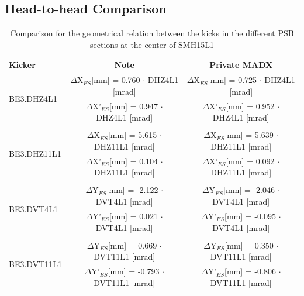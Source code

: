 \documentclass[11pt,letter,english]{article}
\begin{document}
\subsection*{Head-to-head Comparison}

\begin{table}[h]
  \centering
  \caption{
    Comparison for the geometrical relation between the kicks in the different PSB sections at the center of SMH15L1
    }

  \label{tab:geom_rel}
\begin{tabular}{ |l|c|c| }        \hline
  Kicker & Note & Private MADX \\ \hline
  
  \multirow{2}{*}{BE3.DHZ4L1} & $\Delta$X$_{ES}$[mm]  = 0.760 $\cdot$ DHZ4L1 [mrad] & $\Delta$X$_{ES}$[mm]  = {\color{red} 0.725} $\cdot$ DHZ4L1 [mrad] \\ \cline{2-3}
                              & $\Delta$X'$_{ES}$[mm] = 0.947 $\cdot$ DHZ4L1 [mrad] & $\Delta$X'$_{ES}$[mm] = {\color{red} 0.952} $\cdot$ DHZ4L1 [mrad] \\ \hline 
  \multicolumn{3}{|c|}{} \\ \hline

  \multirow{2}{*}{BE3.DHZ11L1} & $\Delta$X$_{ES}$[mm]  = 5.615 $\cdot$ DHZ11L1 [mrad] & $\Delta$X$_{ES}$[mm]  = {\color{red} 5.639} $\cdot$ DHZ11L1 [mrad] \\ \cline{2-3}
                               & $\Delta$X'$_{ES}$[mm] = 0.104 $\cdot$ DHZ11L1 [mrad] & $\Delta$X'$_{ES}$[mm] = {\color{red} 0.092} $\cdot$ DHZ11L1 [mrad] \\ \hline 
  \multicolumn{3}{|c|}{} \\ \hline

  \multirow{2}{*}{BE3.DVT4L1} & $\Delta$Y$_{ES}$[mm]  = -2.122 $\cdot$ DVT4L1 [mrad] & $\Delta$Y$_{ES}$[mm]  = {\color{red} -2.046} $\cdot$ DVT4L1 [mrad] \\ \cline{2-3}
                              & $\Delta$Y'$_{ES}$[mm] =  0.021 $\cdot$ DVT4L1 [mrad] & $\Delta$Y'$_{ES}$[mm] = {\color{red} -0.095} $\cdot$ DVT4L1 [mrad] \\ \hline 
  \multicolumn{3}{|c|}{} \\ \hline
 
  \multirow{2}{*}{BE3.DVT11L1} & $\Delta$Y$_{ES}$[mm]  =  0.669 $\cdot$ DVT11L1 [mrad] & $\Delta$Y$_{ES}$[mm]  = {\color{red}  0.350} $\cdot$ DVT11L1 [mrad] \\ \cline{2-3}
                               & $\Delta$Y'$_{ES}$[mm] = -0.793 $\cdot$ DVT11L1 [mrad] & $\Delta$Y'$_{ES}$[mm] = {\color{red} -0.806} $\cdot$ DVT11L1 [mrad] \\ \hline 

\end{tabular}
\end{table}
\end{document}
